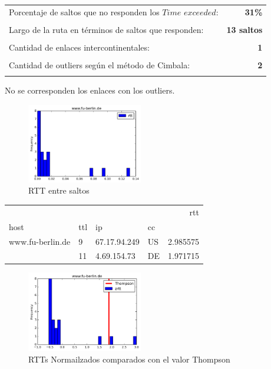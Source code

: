 \begin{center}
\begin{tabular}{p{6.5cm}r}
Porcentaje de saltos que no responden los $Time$ $exceeded$: & \textbf{31\%} \\ \\ 
Largo de la ruta en términos de saltos que responden: &\textbf{13 saltos} \\ \\
Cantidad de enlaces intercontinentales: & \textbf{1} \\ \\
Cantidad de outliers según el método de Cimbala: & \textbf{2} \\ \\
\end{tabular}
\end{center}

No se corresponden los enlaces con los outliers.

\begin{figure}[H]
  \centering
    \includegraphics[width=0.45\textwidth]{histogramas_rtt/www-fu-berlin-de.png}
  \caption{RTT entre saltos}
  \label{entropia-s}
\end{figure}

\begin{center}
\begin{tabular}{llllr}
\toprule
                 &    &                &    &       rtt \\
host & ttl & ip & cc &           \\
\midrule
www.fu-berlin.de & 9  & 67.17.94.249 & US &  2.985575 \\
                 & 11 & 4.69.154.73 &  DE &  1.971715 \\
\bottomrule
\end{tabular}

\end{center}

\begin{figure}[H]
  \centering
    \includegraphics[width=0.45\textwidth]{histogramas_thompson/www-fu-berlin-de.png}
  \caption{RTTs Normailzados comparados con el valor Thompson}
  \label{entropia-s}
\end{figure}

